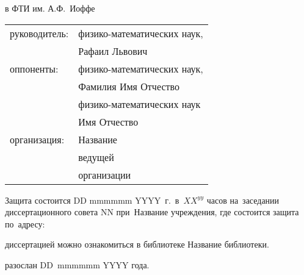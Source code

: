  в ФТИ им. А.Ф.~Иоффе
\vspace{10mm}
\begin{table} [h]  
  \begin{tabular}{ll}
  \fontsize{14pt}{15pt} руководитель: & \fontsize{14pt}{15pt} физико-математических наук,                     \\
                        & \fontsize{14pt}{15pt} Рафаил Львович
\vspace{3mm} \\
  \fontsize{14pt}{15pt} оппоненты:& \fontsize{14pt}{15pt} физико-математических наук,                     \\
                        & \fontsize{14pt}{15pt} Фамилия Имя Отчество \vspace{1mm}         \\
                        & \fontsize{14pt}{15pt} физико-математических наук                    \\
                        & \fontsize{14pt}{15pt} Имя Отчество \vspace{3mm}                \\
  \fontsize{14pt}{15pt} организация:  & \fontsize{14pt}{15pt}\selectfont Название                \\
                        & \fontsize{14pt}{15pt}\selectfont ведущей                     \\
                        & \fontsize{14pt}{15pt}\selectfont организации
  \end{tabular}  
\end{table}

\vspace{20mm}
\noindent Защита состоится DD mmmmmm YYYY~г.~в~$XX^{yy}$ часов на~заседании диссертационного совета $\mbox{NN}$ при~Название учреждения, где состоится защита по~адресу: 

\vspace{15mm}
 диссертацией можно ознакомиться в библиотеке Название библиотеки.

\vspace{15mm}
 разослан DD~mmmmmm YYYY года.

